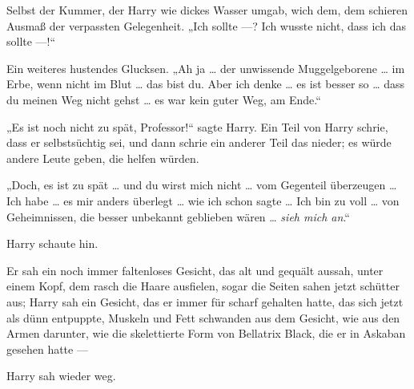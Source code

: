 Selbst der Kummer, der Harry wie dickes Wasser umgab, wich dem, dem schieren Ausmaß der verpassten Gelegenheit.
„Ich sollte —? Ich wusste nicht, dass ich das sollte —!“

Ein weiteres hustendes Glucksen.
„Ah ja … der unwissende Muggelgeborene … im Erbe, wenn nicht im Blut … das bist du. Aber ich denke … es ist besser so … dass du meinen Weg nicht gehst … es war kein guter Weg, am Ende.“

„Es ist noch nicht zu spät, Professor!“ sagte Harry.
Ein Teil von Harry schrie, dass er selbstsüchtig sei, und dann schrie ein anderer Teil das nieder; es würde andere Leute geben, die helfen würden.

„Doch, es ist zu spät … und du wirst mich nicht … vom Gegenteil überzeugen … Ich habe … es mir anders überlegt … wie ich schon sagte … Ich bin zu voll … von Geheimnissen, die besser unbekannt geblieben wären … \emph{sieh mich an}.“

Harry schaute hin.

Er sah ein noch immer faltenloses Gesicht, das alt und gequält aussah, unter einem Kopf, dem rasch die Haare ausfielen, sogar die Seiten sahen jetzt schütter aus; Harry sah ein Gesicht, das er immer für scharf gehalten hatte, das sich jetzt als dünn entpuppte, Muskeln und Fett schwanden aus dem Gesicht, wie aus den Armen darunter, wie die skelettierte Form von Bellatrix Black, die er in Askaban gesehen hatte —

Harry sah wieder weg.

